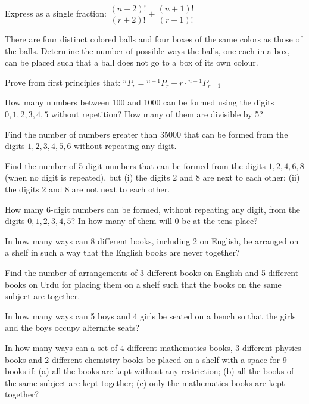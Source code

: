 \documentclass[11pt,a4paper]{article}
\begin{document}
\begin{longlist}
\item Express as a single fraction: $\dfrac{(n+2)!}{(r+2)!}+\dfrac{(n+1)!}{(r+1)!}$

\item There are four distinct colored balls and four boxes of the same colors as those of the balls. Determine the number of possible ways the balls, one each in a box, can be placed such that a ball does not go to a box of its own colour.

\item Prove from first principles that: ${}^{n}P_r={}^{n-1}P_r+r\cdot{}^{n-1}P_{r-1}$

\item How many numbers between 100 and 1000 can be formed using the digits $0,1,2,3,4,5$ without repetition? How many of them are divisible by 5?

\item Find the number of numbers greater than 35000 that can be formed from the digits $1,2,3,4,5,6$ without repeating any digit.

\item Find the number of 5-digit numbers that can be formed from the digits $1,2,4,6,8$ (when no digit is repeated), but (i) the digits 2 and 8 are next to each other; (ii) the digits 2 and 8 are not next to each other.

\item How many 6-digit numbers can be formed, without repeating any digit, from the digits $0,1,2,3,4,5$? In how many of them will 0 be at the tens place?

\item In how many ways can 8 different books, including 2 on English, be arranged on a shelf in such a way that the English books are never together?

\item Find the number of arrangements of 3 different books on English and 5 different books on Urdu for placing them on a shelf such that the books on the same subject are together.

\item In how many ways can 5 boys and 4 girls be seated on a bench so that the girls and the boys occupy alternate seats?

\item In how many ways can a set of 4 different mathematics books, 3 different physics books and 2 different chemistry books be placed on a shelf with a space for 9 books if: (a) all the books are kept without any restriction; (b) all the books of the same subject are kept together; (c) only the mathematics books are kept together?


\end{longlist}
\end{document}
